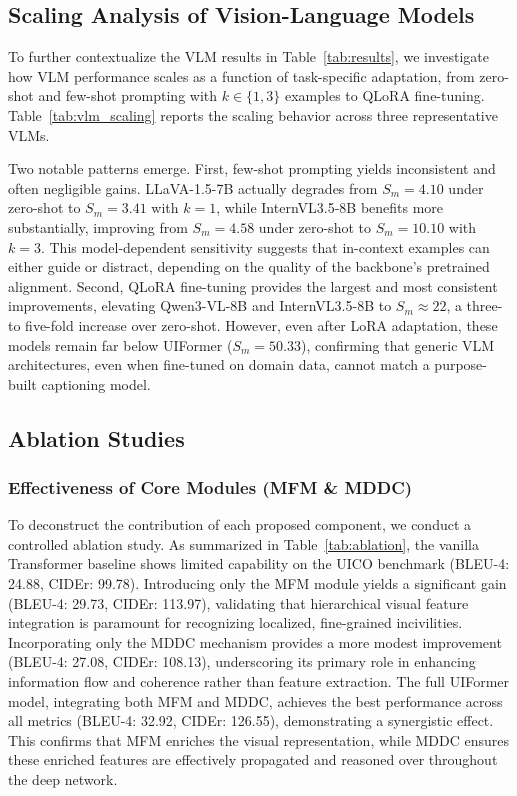 \documentclass[lettersize,journal]{IEEEtran}
\begin{document}
	\vspace{-0.1in}
	\subsection{Scaling Analysis of Vision-Language Models}
	\label{sec:scaling}
	
	To further contextualize the VLM results in Table~\ref{tab:results}, we investigate how VLM performance scales as a function of task-specific adaptation, from zero-shot and few-shot prompting with $k{\in}\{1,3\}$ examples to QLoRA fine-tuning. Table~\ref{tab:vlm_scaling} reports the scaling behavior across three representative VLMs.
	
	Two notable patterns emerge. First, few-shot prompting yields inconsistent and often negligible gains. LLaVA-1.5-7B actually degrades from $S_m{=}4.10$ under zero-shot to $S_m{=}3.41$ with $k{=}1$, while InternVL3.5-8B benefits more substantially, improving from $S_m{=}4.58$ under zero-shot to $S_m{=}10.10$ with $k{=}3$. This model-dependent sensitivity suggests that in-context examples can either guide or distract, depending on the quality of the backbone's pretrained alignment. Second, QLoRA fine-tuning provides the largest and most consistent improvements, elevating Qwen3-VL-8B and InternVL3.5-8B to $S_m{\approx}22$, a three- to five-fold increase over zero-shot. However, even after LoRA adaptation, these models remain far below UIFormer ($S_m{=}50.33$), confirming that generic VLM architectures, even when fine-tuned on domain data, cannot match a purpose-built captioning model.
	
	\subsection{Ablation Studies}
	\subsubsection{Effectiveness of Core Modules (MFM \& MDDC)}
	
	To deconstruct the contribution of each proposed component, we conduct a controlled ablation study. As summarized in Table~\ref{tab:ablation}, the vanilla Transformer baseline shows limited capability on the UICO benchmark (BLEU-4: 24.88, CIDEr: 99.78). Introducing only the MFM module yields a significant gain (BLEU-4: 29.73, CIDEr: 113.97), validating that hierarchical visual feature integration is paramount for recognizing localized, fine-grained incivilities. Incorporating only the MDDC mechanism provides a more modest improvement (BLEU-4: 27.08, CIDEr: 108.13), underscoring its primary role in enhancing information flow and coherence rather than feature extraction. The full UIFormer model, integrating both MFM and MDDC, achieves the best performance across all metrics (BLEU-4: 32.92, CIDEr: 126.55), demonstrating a synergistic effect. This confirms that MFM enriches the visual representation, while MDDC ensures these enriched features are effectively propagated and reasoned over throughout the deep network.
	
\end{document}
